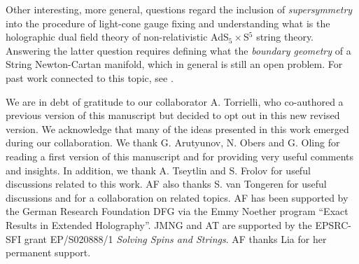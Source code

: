\documentclass[12pt]{article}
\numberwithin{equation}{section}
\begin{document}
Other interesting, more general, questions regard the inclusion of  \emph{supersymmetry} into the procedure of light-cone gauge fixing and understanding what is the holographic dual field theory of non-relativistic AdS$_5\times$S$^5$ string theory. Answering the latter question requires defining what the \emph{boundary geometry} of a String Newton-Cartan manifold, which in general is still an open problem. For past work connected to this topic,  see  \cite{Sakaguchi:2007ba}.



\vskip 0.5cm
 \vskip 0.1cm
\noindent 

\noindent 
We are in debt of gratitude to our collaborator A. Torrielli, who co-authored a previous version of this manuscript but decided to opt out in this new revised version. We acknowledge that many of the ideas presented in this work emerged during our collaboration.  
We thank G. Arutyunov, N. Obers and G. Oling for reading a first version of this manuscript and for providing very useful comments and insights. In addition, we thank A. Tseytlin and S. Frolov for useful discussions related to this work. AF also thanks S. van Tongeren for useful discussions and for a collaboration on related topics. AF has been supported by the German Research Foundation DFG via the Emmy Noether program ``Exact Results in Extended Holography''. JMNG and AT are supported by the EPSRC-SFI grant EP/S020888/1 \emph{Solving Spins and Strings}.
AF thanks Lia for her permanent support.





\setcounter{section}{0}
\setcounter{subsection}{0}
\setcounter{equation}{0}
\end{document}
